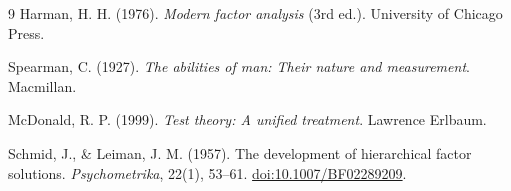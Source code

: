 \documentclass[11pt]{article}
\theoremstyle{plain}
\theoremstyle{remark}
\begin{document}
\begin{thebibliography}{9}
Harman, H. H. (1976).
\newblock \emph{Modern factor analysis} (3rd ed.).
\newblock University of Chicago Press.

Spearman, C. (1927).
\newblock \emph{The abilities of man: Their nature and measurement}.
\newblock Macmillan.

McDonald, R. P. (1999).
\newblock \emph{Test theory: A unified treatment}.
\newblock Lawrence Erlbaum.

Schmid, J., \& Leiman, J. M. (1957).
\newblock The development of hierarchical factor solutions.
\newblock \emph{Psychometrika}, 22(1), 53--61.
\newblock \href{https://doi.org/10.1007/BF02289209}
{doi:10.1007/BF02289209}.

\end{thebibliography}
\end{document}
